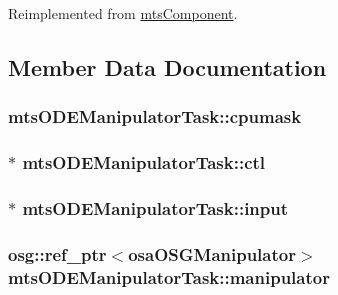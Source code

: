 Reimplemented from \hyperlink{classmts_component_aaf28f0262b44eb6866e10089a02fa6e4}{mts\-Component}.



\subsection{Member Data Documentation}
\hypertarget{classmts_o_d_e_manipulator_task_aaff55dbeff38e947707c6b3405041622}{
\subsubsection[{cpumask}]{ mts\-O\-D\-E\-Manipulator\-Task\-::cpumask}}\label{classmts_o_d_e_manipulator_task_aaff55dbeff38e947707c6b3405041622}
\hypertarget{classmts_o_d_e_manipulator_task_adc6a0ee6337d56ed19e8dddf86586498}{
\subsubsection[{ctl}]{$\ast$ mts\-O\-D\-E\-Manipulator\-Task\-::ctl}}\label{classmts_o_d_e_manipulator_task_adc6a0ee6337d56ed19e8dddf86586498}
\hypertarget{classmts_o_d_e_manipulator_task_ad765a99ba781dadce40237760b2ea115}{
\subsubsection[{input}]{$\ast$ mts\-O\-D\-E\-Manipulator\-Task\-::input}}\label{classmts_o_d_e_manipulator_task_ad765a99ba781dadce40237760b2ea115}
\hypertarget{classmts_o_d_e_manipulator_task_af71c105f986e50bd23dd3a385bbf73d4}{
\subsubsection[{manipulator}]{\setlength{\rightskip}{0pt plus 5cm}osg\-::ref\-\_\-ptr$<${\bf osa\-O\-S\-G\-Manipulator}$>$ mts\-O\-D\-E\-Manipulator\-Task\-::manipulator}}\label{classmts_o_d_e_manipulator_task_af71c105f986e50bd23dd3a385bbf73d4}
